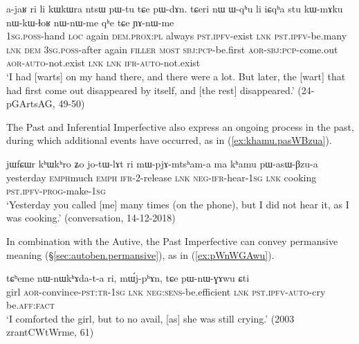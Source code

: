 \begin{exe}
\ex \label{ex:pWtu.pWdAn}
\gll a-jaʁ ri li kɯkɯra ntsɯ pɯ-tu tɕe pɯ-dɤn. tɕeri nɯ ɯ-qʰu li iɕqʰa stu kɯ-mɤku nɯ-kɯ-ɬoʁ nɯ-nɯ-me qʰe tɕe ɲɤ-nɯ-me \\
\textsc{1sg}.\textsc{poss}-hand \textsc{loc} again \textsc{dem}.\textsc{prox}:\textsc{pl} always \textsc{pst}.\textsc{ipfv}-exist \textsc{lnk} \textsc{pst}.\textsc{ipfv}-be.many \textsc{lnk} \textsc{dem} \textsc{3sg}.\textsc{poss}-after again \textsc{filler} \textsc{most} \textsc{sbj}:\textsc{pcp}-be.first \textsc{aor}-\textsc{sbj}:\textsc{pcp}-come.out \textsc{aor}-\textsc{auto}-not.exist \textsc{lnk} \textsc{lnk} \textsc{ifr}-\textsc{auto}-not.exist \\
\glt `I had [warts] on my hand there, and there were a lot. But later, the [wart] that had first come out disappeared by itself, and [the rest] disappeared.' (24-pGArtsAG, 49-50)
\end{exe}

The Past and Inferential Imperfective also express an ongoing process in the past, during which additional events have occurred, as in (\ref{ex:khamu.pasWBzua}).

\begin{exe}
\ex \label{ex:khamu.pasWBzua}
\gll jɯfɕɯr kʰɯ\redp{}kʰro ʑo jo-tɯ-lɤt ri mɯ-pjɤ-mtsʰam-a ma kʰamu pɯ-asɯ-βzu-a   \\
yesterday \textsc{emph}\redp{}much \textsc{emph} \textsc{ifr}-2-release \textsc{lnk} \textsc{neg}-\textsc{ifr}-hear-\textsc{1sg} \textsc{lnk} cooking \textsc{pst}.\textsc{ipfv}-\textsc{prog}-make-\textsc{1sg} \\
\glt `Yesterday you called [me] many times (on the phone), but I did not hear it, as I was cooking.' (conversation, 14-12-2018)
\end{exe}


In combination with the Autive, the Past Imperfective can convey permansive meaning (§\ref{sec:autoben.permansive}), as in (\ref{ex:pWnWGAwu}).

\begin{exe}
\ex \label{ex:pWnWGAwu}
\gll tɕʰeme nɯ-nɯkʰɤda-t-a ri, mɯ́j-pʰɤn, tɕe pɯ-nɯ-ɣɤwu ɕti \\
girl \textsc{aor}-convince-\textsc{pst}:\textsc{tr}-\textsc{1sg} \textsc{lnk} \textsc{neg}:\textsc{sens}-be.efficient \textsc{lnk} \textsc{pst}.\textsc{ipfv}-\textsc{auto}-cry be.\textsc{aff}:\textsc{fact} \\
\glt `I comforted the girl, but to no avail, [as] she was still crying.' (2003 zrantCWtWrme, 61)
\end{exe}

